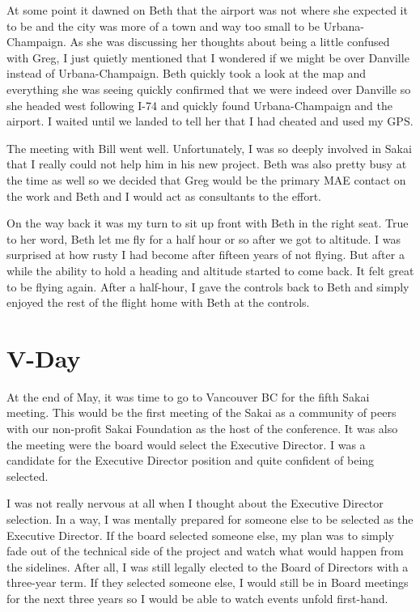 \documentclass[12pt]{book}
\begin{document}
At some point it dawned on Beth that
the airport was not where she expected it to be and the city was
more of a town and way too small to be Urbana-Champaign.  As she was
discussing her thoughts about being a little confused with Greg, I just
quietly mentioned that I wondered if we might be over
Danville instead of Urbana-Champaign.  Beth quickly took a look
at the map and everything she was seeing quickly confirmed that
we were indeed over Danville so she headed west following I-74
and quickly found Urbana-Champaign and the airport.  I waited
until we landed to tell her that I had cheated and used my GPS.

The meeting with Bill went well.  Unfortunately, I was so deeply
involved in Sakai that I really could not help him in his new project.
Beth was also pretty busy at the time as well so we decided that
Greg would be the primary MAE contact on the work and Beth and
I would act as consultants to the effort.

On the way back it was my turn to sit up front with Beth in the right seat.
True to her word, Beth let me fly for a half hour or so after we
got to altitude.  I was surprised at how rusty I had become after fifteen
years of not flying.  But after a while the ability to hold a heading and
altitude started to come back.   It felt great to be flying again.
After a half-hour, I gave the controls back to Beth and simply enjoyed the
rest of the flight home with Beth at the controls.

\chapter{V-Day}

At the end of May, it was time to go to Vancouver BC for the fifth Sakai
meeting.  This would be the first meeting of the Sakai as a community
of peers with our non-profit Sakai Foundation as the host of
the conference.  It was also the meeting were the board would select the
Executive Director.  I was a candidate for the Executive Director position
and quite confident of being selected.

I was not really nervous at all when I
thought about the Executive Director selection.  In a way, I
was mentally prepared for someone else to be selected as the Executive Director.
If the board selected someone else, my plan was to simply fade out of the
technical side of the project and watch what would happen from the
sidelines.  After all, I was still legally elected to the
Board of Directors with a three-year term.  If they selected someone
else, I would still be in Board meetings for the next
three years so I would be able to watch events unfold first-hand.
\end{document}
